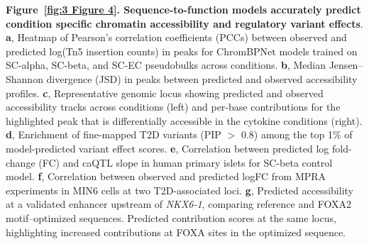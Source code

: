 \thispagestyle{plain}
\noindent
\textbf{Figure~\ref{fig:3 Figure 4}. Sequence-to-function models accurately predict condition specific chromatin accessibility and regulatory variant effects}. \textbf{a}, Heatmap of Pearson’s correlation coefficients (PCCs) between observed and predicted log(Tn5 insertion counts) in peaks for ChromBPNet models trained on SC-alpha, SC-beta, and SC-EC pseudobulks across conditions. \textbf{b}, Median Jensen–Shannon divergence (JSD) in peaks between predicted and observed accessibility profiles. \textbf{c}, Representative genomic locus showing predicted and observed accessibility tracks across conditions (left) and per-base contributions for the highlighted peak that is differentially accessible in the cytokine conditions (right). \textbf{d}, Enrichment of fine-mapped T2D variants (PIP $>$ 0.8) among the top 1\% of model-predicted variant effect scores. \textbf{e}, Correlation between predicted log fold-change (FC) and caQTL slope in human primary islets for SC-beta control model. \textbf{f}, Correlation between observed and predicted logFC from MPRA experiments in MIN6 cells at two T2D-associated loci. \textbf{g}, Predicted accessibility at a validated enhancer upstream of \textit{NKX6-1}, comparing reference and FOXA2 motif–optimized sequences. Predicted contribution scores at the same locus, highlighting increased contributions at FOXA sites in the optimized sequence.

\clearpage

